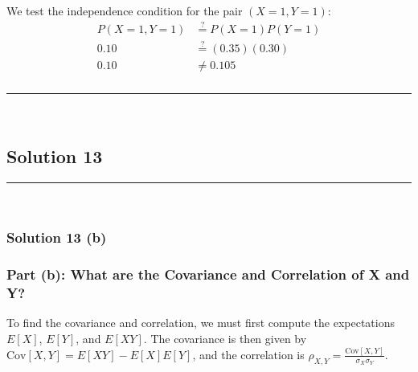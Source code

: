 \documentclass{article}
\begin{document}
We test the independence condition for the pair $(X=1, Y=1)$:
\begin{align*}
    P(X=1, Y=1) &\stackrel{?}{=} P(X=1)P(Y=1) \\
    0.10 &\stackrel{?}{=} (0.35)(0.30) \\
    0.10 &\neq 0.105
\end{align*}

\subsubsection*{}

\noindent\rule{\textwidth}{0.4pt}\\

\newpage

\subsection*{Solution 13}
\noindent\rule{\textwidth}{0.4pt}\\
\subsubsection*{Solution  13 (b)}

\subsubsection*{Part (b): What are the Covariance and Correlation of X and Y?}

\parbox{\textwidth}{
To find the covariance and correlation, we must first compute the expectations $E[X]$, $E[Y]$, and $E[XY]$. The covariance is then given by $\text{Cov}[X, Y] = E[XY] - E[X]E[Y]$, and the correlation is $\rho_{X, Y} = \frac{\text{Cov}[X, Y]}{\sigma_X \sigma_Y}$.
}
\vspace{1em}
\end{document}
